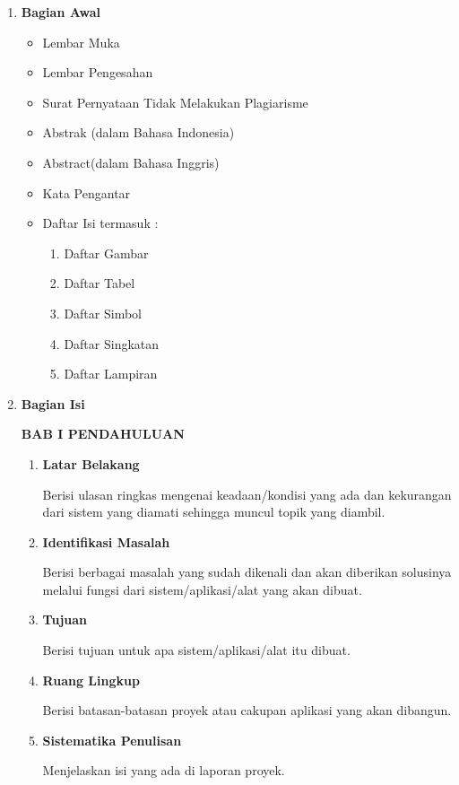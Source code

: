 \begin{enumerate}
\item \textbf{ Bagian Awal}
	\begin{itemize}
		\item Lembar	Muka	
		\item Lembar Pengesahan
		\item Surat	Pernyataan	Tidak	Melakukan	Plagiarisme
	 \item Abstrak	(dalam	Bahasa	Indonesia)
	 \item Abstract(dalam	Bahasa	Inggris)
	 \item Kata	Pengantar
	 \item Daftar	Isi	termasuk	:
 \begin{enumerate}[label=(\alph*)]
 
	\item Daftar	Gambar
	\item Daftar	Tabel
	\item Daftar	Simbol
	\item Daftar	Singkatan	
	\item Daftar	Lampiran
 \end{enumerate}
 \end{itemize}
 
\item \textbf{Bagian Isi}
 	\par \textbf{BAB	I PENDAHULUAN}
 	
 	\begin{enumerate} [label=1.\arabic*]
 	\item \textbf{ Latar	Belakang} \par 
Berisi	ulasan	ringkas	mengenai	keadaan/kondisi	yang	ada	dan	
kekurangan	 dari	 sistem	 yang	 diamati	 sehingga	 muncul	 topik	
yang	diambil.

\item \textbf{ Identifikasi	Masalah} \par 
Berisi	 berbagai	 masalah	 yang	 sudah	 dikenali	 dan	 	 akan diberikan	 solusinya	 melalui	 fungsi	 dari	 sistem/aplikasi/alat	yang	akan	dibuat.

\item \textbf{Tujuan} \par
Berisi	tujuan	untuk	apa	sistem/aplikasi/alat	itu	dibuat.

\item \textbf{ Ruang	Lingkup	} \par
Berisi	batasan-batasan	proyek	atau	cakupan	aplikasi	yang	akan	
dibangun.

\item \textbf{ Sistematika	Penulisan} \par
Menjelaskan	isi	yang	ada	di	laporan	proyek.\\
 

\end{enumerate}
\end{enumerate}
